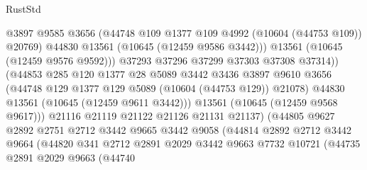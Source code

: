 \begin{lexlean}{RustStd}
\begin{coremodule}
                                    @3897
                                    @9585
                                    @3656
                                    (@44748 @109 @1377 @109 @4992 (@10604 (@44753 @109)) @20769)
                                    @44830
                                    @13561
                                    (@10645 (@12459 @9586 @3442)))
                                  @13561
                                  (@10645 (@12459 @9576 @9592)))
                                @37293
                                @37296
                                @37299
                                @37303
                                @37308
                                @37314))
                            (@44853
                              @285
                              @120
                              @1377
                              @28
                              @5089
                              @3442
                              @3436
                              @3897
                              @9610
                              @3656
                              (@44748 @129 @1377 @129 @5089 (@10604 (@44753 @129)) @21078)
                              @44830
                              @13561
                              (@10645 (@12459 @9611 @3442)))
                            @13561
                            (@10645 (@12459 @9568 @9617)))
                          @21116
                          @21119
                          @21122
                          @21126
                          @21131
                          @21137)
                        (@44805
                          @9627
                          @2892
                          @2751
                          @2712
                          @3442
                          @9665
                          @3442
                          @9058
                          (@44814
                            @2892
                            @2712
                            @3442
                            @9664
                            (@44820
                              @341
                              @2712
                              @2891
                              @2029
                              @3442
                              @9663
                              @7732
                              @10721
                              (@44735
                                @2891
                                @2029
                                @9663
                                (@44740

\end{coremodule}
\end{lexlean}
